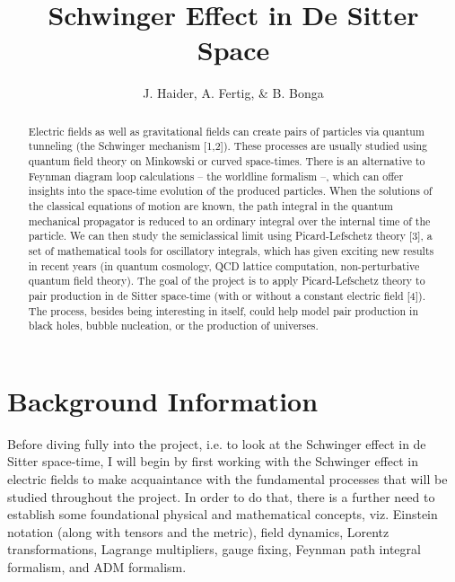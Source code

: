 \documentclass[12pt]{revtex4}
\begin{document}
	
	\begin{titlepage}
		\title{Schwinger Effect in De Sitter Space}
		
		\author{J. Haider, A. Fertig, \& B. Bonga}
		
		
		
		
		\begin{abstract}
			Electric fields as well as gravitational fields can create pairs of particles via quantum tunneling (the Schwinger mechanism [1,2]). These processes are usually studied using quantum field theory on Minkowski or curved space-times. There is an alternative to Feynman diagram loop calculations -- the worldline formalism --, which can offer insights into the space-time evolution of the produced particles.
			When the solutions of the classical equations of motion are known, the path integral in the quantum mechanical propagator is reduced to an ordinary integral over the internal time of the particle. We can then study the semiclassical limit using Picard-Lefschetz theory [3], a set of mathematical tools for oscillatory integrals, which has given exciting new results in recent years (in quantum cosmology, QCD lattice computation, non-perturbative quantum field theory). 
			The goal of the project is to apply Picard-Lefschetz theory to pair production in de Sitter space-time (with or without a constant electric field [4]). The process, besides being interesting in itself, could help model pair production in black holes, bubble nucleation, or the production of universes.
			
		\end{abstract}
	\maketitle
	\end{titlepage}

\tableofcontents
\newpage

\section{Background Information} \label{background}
Before diving fully into the project, i.e. to look at the Schwinger effect in de Sitter space-time, I will begin by first working with the Schwinger effect in electric fields to make acquaintance with the fundamental processes that will be studied throughout the project. In order to do that, there is a further need to establish some foundational physical and mathematical concepts, viz. Einstein notation (along with tensors and the metric), field dynamics, Lorentz transformations, Lagrange multipliers, gauge fixing, Feynman path integral formalism, and ADM formalism.
\end{document}
